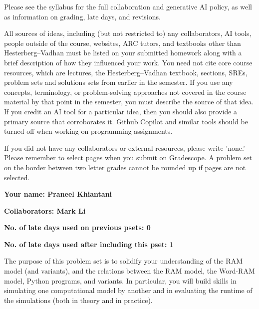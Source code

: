 \documentclass[11pt]{article}
\begin{document}

Please see the syllabus for the full collaboration and generative AI policy, as well as information on grading, late days, and revisions.

All sources of ideas, including (but not restricted to) any collaborators, AI tools, people outside of the course, websites, ARC tutors, and textbooks other than Hesterberg--Vadhan must be listed on your submitted homework along with a brief description of how they influenced your work. You need not cite core course resources, which are lectures, the Hesterberg--Vadhan textbook, sections, SREs, problem sets and solutions sets from earlier in the semester. If you use any concepts, terminology, or problem-solving approaches not covered in the course material by that point in the semester, you must describe the source of that idea. If you credit an AI tool for a particular idea, then you should also provide a primary source that corroborates it. Github Copilot and similar tools should be turned off when working on programming assignments.

If you did not have any collaborators or external resources, please write 'none.' Please remember to select pages when you submit on Gradescope. A problem set on the border between two letter grades cannot be rounded up if pages are not selected. 

\textbf{Your name: Praneel Khiantani }

\textbf{Collaborators: Mark Li}

\textbf{No. of late days used on previous psets: 0}

\textbf{No. of late days used after including this pset: 1}

\vspace{1em}
The purpose of this problem set is to solidify your understanding of the RAM model (and variants), and the relations between the RAM model, the Word-RAM model, Python programs, and variants. In particular, you will build skills in simulating one computational model by another and in evaluating the runtime of the simulations (both in theory and in practice).
\end{document}
